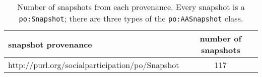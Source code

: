 \begin{table*}[h!]
\begin{center}
\caption{Number of snapshots from each provenance. Every snapshot is a \texttt{po:Snapshot}; there are three types of the \texttt{po:AASnapshot} class.}
\begin{tabular}{| l | c |}\hline
\textbf{snapshot provenance} & \textbf{number of snapshots} \\\hline\hline\hline
http://purl.org/socialparticipation/po/Snapshot & 117 \\\hline
\end{tabular}\end{center}
\end{table*}